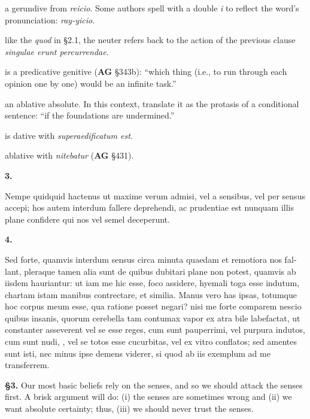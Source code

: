  a gerundive from \textit{reicio}. Some authors spell with a double \textit{i} to reflect the word's pronunciation: \textit{ray-yicio}.

 like the \textit{quod} in §2.1, the neuter refers back to the action of the previous clause \textit{singulae erunt percurrendae}.

 is a predicative genitive (\textbf{AG} §343b): ``which thing (i.e., to run through each opinion one by one) would be an infinite task.''

 an ablative absolute. In this context, translate it as the protasis of a conditional sentence: ``if the foundations are undermined.''

 is dative with \textit{superaedificatum est}.

 ablative with \textit{nitebatur} (\textbf{AG} §431).


\clearpage

\beginnumbering
\pstart
\textbf{3.} \begin{latin}Nempe quidquid hactenus ut maxime verum admisi, vel a sensibus, vel per sensus accepi; hos autem interdum fallere deprehendi, ac prudentiae est nunquam illis plane confidere qui nos vel semel deceperunt.\end{latin}
\pend
\endnumbering
\beginnumbering
\pstart
\textbf{4.} \begin{latin}Sed forte, quamvis interdum sensus circa minuta quaedam et remotiora nos fallant, pleraque tamen alia sunt de quibus dubitari plane non potest, quamvis ab iisdem hauriantur: ut iam me hic esse, foco assidere, hyemali toga esse indutum, chartam istam manibus contrectare, et similia. Manus vero has ipsas, totumque hoc corpus meum esse, qua ratione posset negari? nisi me forte comparem nescio quibus insanis, quorum cerebella tam contumax vapor ex atra bile labefactat, ut constanter asseverent vel se esse reges, cum sunt pauperrimi, vel purpura indutos, cum sunt nudi, , vel se totos esse cucurbitas, vel ex vitro conflatos; sed amentes sunt isti, nec minus ipse demens viderer, si quod ab iis exemplum ad me transferrem.\end{latin}
\pend
\endnumbering

\prenotes

\textbf{§3.} Our most basic beliefs rely on the senses, and so we should attack the senses first. A brisk argument will do: (i) the senses are sometimes wrong and (ii) we want absolute certainty; thus, (iii) we should never trust the senses.

